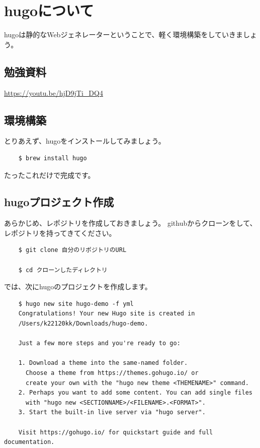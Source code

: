 \chapter{hugoについて}
hugoは静的なWebジェネレーターということで、軽く環境構築をしていきましょう。

\section{勉強資料}
  \url{https://youtu.be/hjD9jTi_DQ4}

\section{環境構築}
とりあえず、hugoをインストールしてみましょう。

  \begin{shaded}
    \begin{verbatim}
    $ brew install hugo
    \end{verbatim}
  \end{shaded}
  たったこれだけで完成です。

\section{hugoプロジェクト作成}
  あらかじめ、レポジトリを作成しておきましょう。
  githubからクローンをして、レポジトリを持ってきてください。

  \begin{shaded}
    \begin{verbatim}
    $ git clone 自分のリポジトリのURL

    $ cd クローンしたディレクトリ
    \end{verbatim}
  \end{shaded}

    では、次にhugoのプロジェクトを作成します。

  \begin{shaded}
    \begin{verbatim}
    $ hugo new site hugo-demo -f yml
    Congratulations! Your new Hugo site is created in 
    /Users/k22120kk/Downloads/hugo-demo.

    Just a few more steps and you're ready to go:

    1. Download a theme into the same-named folder.
      Choose a theme from https://themes.gohugo.io/ or
      create your own with the "hugo new theme <THEMENAME>" command.
    2. Perhaps you want to add some content. You can add single files
      with "hugo new <SECTIONNAME>/<FILENAME>.<FORMAT>".
    3. Start the built-in live server via "hugo server".

    Visit https://gohugo.io/ for quickstart guide and full documentation.
    \end{verbatim}
  \end{shaded}

